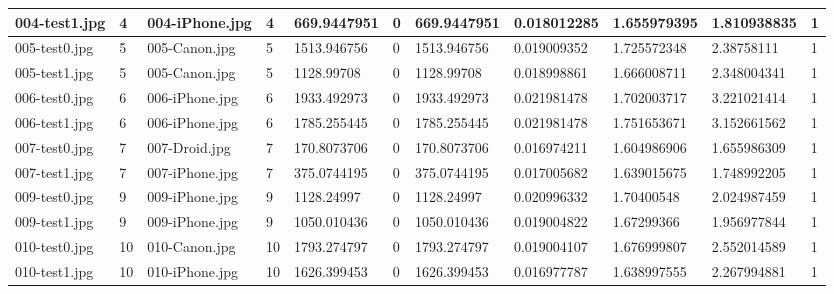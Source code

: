 \begin{landscape}
\begin{longtable}{|p{2cm}|p{1cm}|p{2cm}|p{1cm}|p{2cm}|p{1cm}|p{2cm}|p{2cm}|p{2cm}|p{2cm}|p{1cm}|}
	\hline
	004-test1.jpg & 4        & 004-iPhone.jpg & 4                    & 669.9447951   & 0                & 669.9447951         & 0.018012285   & 1.655979395   & 1.810938835       & 1         \\ 
	\hline
	005-test0.jpg & 5        & 005-Canon.jpg  & 5                    & 1513.946756   & 0                & 1513.946756         & 0.019009352   & 1.725572348   & 2.38758111        & 1         \\ 
	\hline
	005-test1.jpg & 5        & 005-Canon.jpg  & 5                    & 1128.99708    & 0                & 1128.99708          & 0.018998861   & 1.666008711   & 2.348004341       & 1         \\ 
	\hline
	006-test0.jpg & 6        & 006-iPhone.jpg & 6                    & 1933.492973   & 0                & 1933.492973         & 0.021981478   & 1.702003717   & 3.221021414       & 1         \\ 
	\hline
	006-test1.jpg & 6        & 006-iPhone.jpg & 6                    & 1785.255445   & 0                & 1785.255445         & 0.021981478   & 1.751653671   & 3.152661562       & 1         \\ 
	\hline
	007-test0.jpg & 7        & 007-Droid.jpg  & 7                    & 170.8073706   & 0                & 170.8073706         & 0.016974211   & 1.604986906   & 1.655986309       & 1         \\ 
	\hline
	007-test1.jpg & 7        & 007-iPhone.jpg & 7                    & 375.0744195   & 0                & 375.0744195         & 0.017005682   & 1.639015675   & 1.748992205       & 1         \\ 
	\hline
	009-test0.jpg & 9        & 009-iPhone.jpg & 9                    & 1128.24997    & 0                & 1128.24997          & 0.020996332   & 1.70400548    & 2.024987459       & 1         \\ 
	\hline
	009-test1.jpg & 9        & 009-iPhone.jpg & 9                    & 1050.010436   & 0                & 1050.010436         & 0.019004822   & 1.67299366    & 1.956977844       & 1         \\ 
	\hline
	010-test0.jpg & 10       & 010-Canon.jpg  & 10                   & 1793.274797   & 0                & 1793.274797         & 0.019004107   & 1.676999807   & 2.552014589       & 1         \\ 
	\hline
	010-test1.jpg & 10       & 010-iPhone.jpg & 10                   & 1626.399453   & 0                & 1626.399453         & 0.016977787   & 1.638997555   & 2.267994881       & 1         \\ 

\end{longtable}
\end{landscape}
